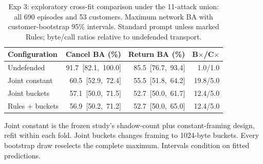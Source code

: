 \begin{table}[t]\centering\footnotesize\setlength{\tabcolsep}{2pt}
\caption{Exp 3: exploratory cross-fit comparison under the 11-attack union: all 690 episodes and 53 customers. Maximum network BA with customer-bootstrap 95\% intervals. Standard prompt unless marked Rules; byte/call ratios relative to undefended transport.}\label{tab:r5}
\begin{tabular}{@{}lrrr@{}}\toprule
Configuration & Cancel BA (\%) & Return BA (\%) & B$\times$/C$\times$\\\midrule
Undefended & \mbox{91.7 [82.1, 100.0]} & \mbox{85.5 [76.7, 93.4]} & 1.0/1.0\\
Joint constant & \mbox{60.5 [52.9, 72.4]} & \mbox{55.5 [51.8, 64.2]} & 19.8/5.0\\
Joint buckets & \mbox{57.1 [50.0, 71.5]} & \mbox{52.7 [50.0, 61.7]} & 12.4/5.0\\
Rules + buckets & \mbox{56.9 [50.2, 71.2]} & \mbox{52.7 [50.0, 65.0]} & 12.4/5.0\\
\bottomrule\end{tabular}
\par\smallskip\raggedright\footnotesize Joint constant is the frozen study's shadow-count plus constant-framing design, refit within each fold. Joint buckets changes framing to 1024-byte buckets. Every bootstrap draw reselects the complete maximum. Intervals condition on fitted predictions.
\end{table}
